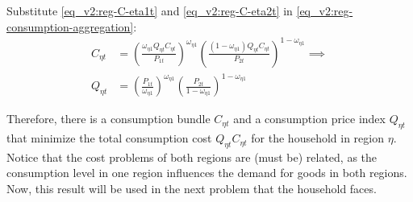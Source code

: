 \documentclass[../thesis.tex]{subfiles}
\begin{document}
	Substitute \ref{eq_v2:reg-C-eta1t} and \ref{eq_v2:reg-C-eta2t} in \ref{eq_v2:reg-consumption-aggregation}:
	\begin{align}
		C_{\eta t} &= \left( \frac{\omega_{\eta 1} Q_{\eta t} C_{\eta t}}{P_{1t}} \right)^{\omega_{\eta 1}} \left( \frac{(1 - \omega_{\eta 1}) Q_{\eta t} C_{\eta t}}{P_{2t}} \right)^{1-\omega_{\eta 1}} \implies \nonumber \\
		Q_{\eta t} &= \left( \frac{P_{1 t}}{\omega_{\eta 1}} \right)^{\omega_{\eta 1}} \left( \frac{P_{2 t}}{1 -\omega_{\eta 1}} \right)^{1 -\omega_{\eta 1}} \label{eq_v2:reg-total-expense-level}
	\end{align}

\begin{comment}
	
		Divide \ref{eq_v2:reg-total-expense-level} of region 1 by region 2:
	\begin{align}
		\frac{Q_{1t}}{Q_{2t}} &= \frac{\left( \frac{P_{1 t}}{\omega_{11}} \right)^{\omega_{11}} \left( \frac{P_{2 t}}{1 -\omega_{11}} \right)^{1 -\omega_{11}}}{\left( \frac{P_{1 t}}{\omega_{21}} \right)^{\omega_{21}} \left( \frac{P_{2 t}}{1 -\omega_{21}} \right)^{1 -\omega_{21}}} \implies \nonumber \\
		\frac{Q_{1t}}{Q_{2t}} &= \frac{\omega_{21}^{\omega_{21}} (1 -\omega_{21})^{1 -\omega_{21}}}{\omega_{11}^{\omega_{11}} (1 - \omega_{11})^{1 - \omega_{11}}} \label{eq_v2:reg-total-expense-level-2}
	\end{align}
	
\end{comment}


	Therefore, there is a consumption bundle \(C_{\eta t}\) and a consumption price index \(Q_{\eta t}\) that minimize the total consumption cost \(Q_{\eta t} C_{\eta t}\) for the household in region \(\eta\). Notice that the cost problems of both regions are (must be) related, as the consumption level in one region influences the demand for goods in both regions. Now, this result will be used in the next problem that the household faces.
\end{document}
